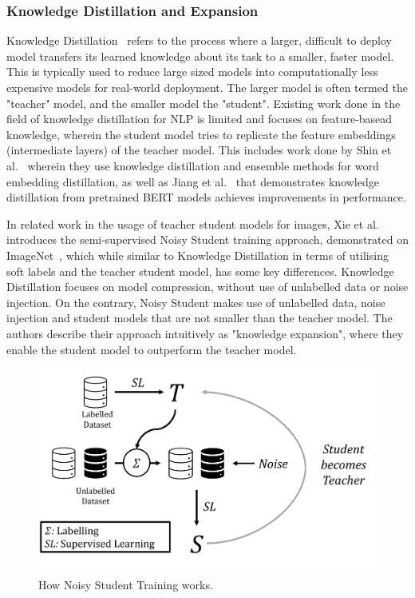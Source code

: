 \documentclass[12pt]{article}
\begin{document}
{\subsubsection{Knowledge Distillation and Expansion}
Knowledge Distillation~\cite{knowledgedistillation} refers to the process where a larger, difficult to deploy model transfers its learned knowledge about its task to a smaller, faster model. This is typically used to reduce large sized models into computationally less expensive models for real-world deployment. The larger model is often termed the "teacher" model, and the smaller model the "student". Existing work done in the field of knowledge distillation for NLP is limited and focuses on feature-basead knowledge, wherein the student model tries to replicate the feature embeddings (intermediate layers) of the teacher model. This includes work done by Shin et al.~\cite{TSembeddingdistillation} wherein they use knowledge distillation and ensemble methods for word embedding distillation, as well as Jiang et al.~\cite{KDberttospeech} that demonstrates knowledge distillation from pretrained BERT models achieves improvements in performance. 

In related work in the usage of teacher student models for images, Xie et al.~\cite{noisystudent} introduces the semi-supervised Noisy Student training approach, demonstrated on ImageNet~\cite{imagenet}, which while similar to Knowledge Distillation in terms of utilising soft labels and the teacher student model, has some key differences. Knowledge Distillation focuses on model compression, without use of unlabelled data or noise injection. On the contrary, Noisy Student makes use of unlabelled data, noise injection and student models that are not smaller than the teacher model. The authors describe their approach intuitively as "knowledge expansion", where they enable the student model to outperform the teacher model.

\begin{figure}[!ht]
    \begin{center}
        \includegraphics[scale=0.5]{images/noisy_student.png}
        \caption{How Noisy Student Training works.}
        \label{fig:noisystudent}
    \end{center}
\end{figure}

}
\end{document}
